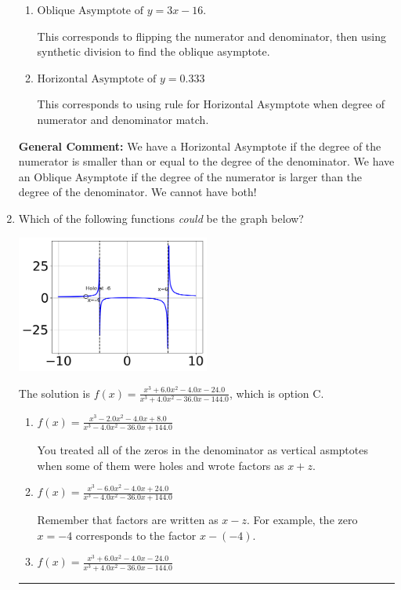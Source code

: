 \documentclass{extbook}[14pt]
\newcommand{\litem}[1]{\item #1

\rule{\textwidth}{0.4pt}}
\begin{document}
\begin{enumerate}
{\begin{enumerate}[label=\Alph*.]
* This is the correct option.
\item \( \text{Oblique Asymptote of } y = 3x -16. \)

This corresponds to flipping the numerator and denominator, then using synthetic division to find the oblique asymptote.
\item \( \text{Horizontal Asymptote of } y = 0.333  \)

This corresponds to using rule for Horizontal Asymptote when degree of numerator and denominator match.
\end{enumerate}

\textbf{General Comment:} We have a Horizontal Asymptote if the degree of the numerator is smaller than or equal to the degree of the denominator. We have an Oblique Asymptote if the degree of the numerator is larger than the degree of the denominator. We cannot have both!
}
\litem{
Which of the following functions \textit{could} be the graph below?

\begin{center}
    \includegraphics[width=0.5\textwidth]{../Figures/identifyGraphOfRationalFunctionC.png}
\end{center}


The solution is \( f(x)=\frac{x^{3} +6.0 x^{2} -4.0 x -24.0}{x^{3} +4.0 x^{2} -36.0 x -144.0} \), which is option C.\begin{enumerate}[label=\Alph*.]
\item \( f(x)=\frac{x^{3} -2.0 x^{2} -4.0 x + 8.0}{x^{3} -4.0 x^{2} -36.0 x + 144.0} \)

You treated all of the zeros in the denominator as vertical asmptotes when some of them were holes and wrote factors as $x+z$.
\item \( f(x)=\frac{x^{3} -6.0 x^{2} -4.0 x + 24.0}{x^{3} -4.0 x^{2} -36.0 x + 144.0} \)

Remember that factors are written as $x-z$. For example, the zero $x=-4$ corresponds to the factor $x-(-4)$.
\item \( f(x)=\frac{x^{3} +6.0 x^{2} -4.0 x -24.0}{x^{3} +4.0 x^{2} -36.0 x -144.0} \)


\end{enumerate}}
\end{enumerate}
\end{document}
